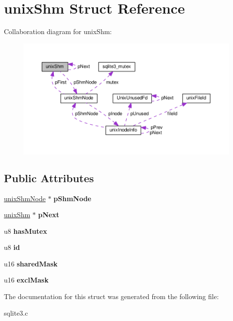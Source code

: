 \hypertarget{structunixShm}{}\section{unix\+Shm Struct Reference}
\label{structunixShm}


Collaboration diagram for unix\+Shm\+:\nopagebreak
\begin{figure}[H]
\begin{center}
\leavevmode
\includegraphics[width=350pt]{structunixShm__coll__graph}
\end{center}
\end{figure}
\subsection*{Public Attributes}
\begin{DoxyCompactItemize}
\item 
\hyperlink{structunixShmNode}{unix\+Shm\+Node} $\ast$ {\bfseries p\+Shm\+Node}\hypertarget{structunixShm_a8ab421232d29e3237262ef46775199ee}{}\label{structunixShm_a8ab421232d29e3237262ef46775199ee}

\item 
\hyperlink{structunixShm}{unix\+Shm} $\ast$ {\bfseries p\+Next}\hypertarget{structunixShm_a0d5229cf734581f51cdf16dd7d5ce93a}{}\label{structunixShm_a0d5229cf734581f51cdf16dd7d5ce93a}

\item 
u8 {\bfseries has\+Mutex}\hypertarget{structunixShm_a43903be262472299c5eee917ba7c523c}{}\label{structunixShm_a43903be262472299c5eee917ba7c523c}

\item 
u8 {\bfseries id}\hypertarget{structunixShm_a88a5e7161ff31f85740dbfc0ba7ad38a}{}\label{structunixShm_a88a5e7161ff31f85740dbfc0ba7ad38a}

\item 
u16 {\bfseries shared\+Mask}\hypertarget{structunixShm_a768aa62a6ea2bd91ab60a34d7654811b}{}\label{structunixShm_a768aa62a6ea2bd91ab60a34d7654811b}

\item 
u16 {\bfseries excl\+Mask}\hypertarget{structunixShm_ac6f786d95952e51cab941cbfb9243c8e}{}\label{structunixShm_ac6f786d95952e51cab941cbfb9243c8e}

\end{DoxyCompactItemize}


The documentation for this struct was generated from the following file\+:\begin{DoxyCompactItemize}
\item 
sqlite3.\+c\end{DoxyCompactItemize}
